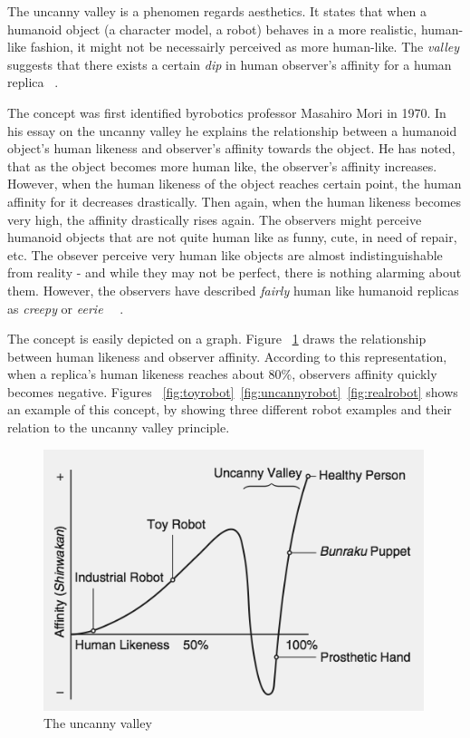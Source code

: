 The uncanny valley is a phenomen regards aesthetics. It states that when a humanoid object (a character model, a robot) behaves in a more realistic, human-like fashion, it might not be necessairly perceived as more human-like. The \textit{valley} suggests that there exists a certain \textit{dip} in human observer's affinity for a human replica ~\cite{uncanny1}.

The concept was first identified byrobotics professor Masahiro Mori in 1970. In his essay on the uncanny valley he explains the relationship between a humanoid object's human likeness and observer's affinity towards the object. He has noted, that as the object becomes more human like, the observer's affinity increases. However, when the human likeness of the object reaches certain point, the human affinity for it decreases drastically. Then again, when the human likeness becomes very high, the affinity drastically rises again. The observers might perceive humanoid objects that are not quite human like as funny, cute, in need of repair, etc. The obsever perceive very human like objects are almost indistinguishable from reality - and while they may not be perfect, there is nothing alarming about them. However, the observers have described \textit{fairly} human like humanoid replicas as \textit{creepy} or \textit{eerie} ~\cite{uncanny1}~\cite{uncanny2}.

The concept is easily depicted on a graph. Figure ~\ref{fig:uncanny} draws the relationship between human likeness and observer affinity. According to this representation, when a replica's human likeness reaches about 80\%, observers affinity quickly becomes negative. Figures ~\ref{fig:toyrobot}~\ref{fig:uncannyrobot}~\ref{fig:realrobot} shows an example of this concept, by showing three different robot examples and their relation to the uncanny valley principle. 

\begin{figure}[H]
\centerline{\includegraphics[width = 30em,scale=0.25]{img/uncanny.png}}
\caption{The uncanny valley}\label{fig:uncanny}
\end{figure}

